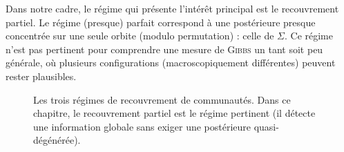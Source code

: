 Dans notre cadre, le régime qui présente l'intérêt principal est le recouvrement partiel. Le régime (presque) parfait correspond à une postérieure presque concentrée sur une seule orbite (modulo permutation) : celle de $\Sigma$. Ce régime n'est pas pertinent pour comprendre une mesure de \textsc{Gibbs} \cite{Reichardt2006} un tant soit peu générale, où plusieurs configurations (macroscopiquement différentes) peuvent rester plausibles. 



\begin{figure}[H]
\centering
{}
\caption{Les trois régimes de recouvrement de communautés. Dans ce chapitre, le recouvrement partiel est le régime pertinent (il détecte une information globale sans exiger une postérieure quasi-dégénérée).}
\label{fig:chapII_recovery_regimes}
\end{figure}

